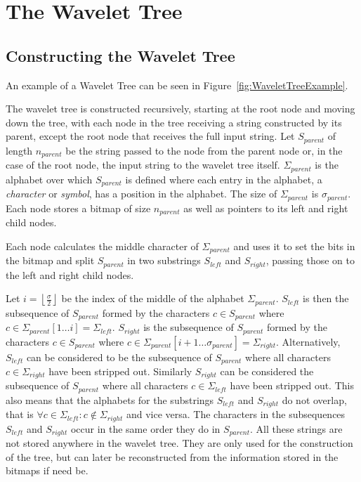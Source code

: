 \section{The Wavelet Tree}


\subsection{Constructing the Wavelet Tree}
\label{sec:nodeconstruction}
An example of a Wavelet Tree can be seen in Figure~\ref{fig:WaveletTreeExample}.

The wavelet tree is constructed recursively, starting at the root node and moving down the tree, with each node in the tree receiving a string constructed by its parent, except the root node that receives the full input string.
Let $S_{\mathit{parent}}$ of length $n_{\mathit{parent}}$ be the string passed to the node from the parent node or, in the case of the root node, the input string to the wavelet tree itself.
$\Sigma_{\mathit{parent}}$ is the alphabet over which $S_{\mathit{parent}}$ is defined where each entry in the alphabet, a \textit{character} or \textit{symbol}, has a position in the alphabet.
The size of $\Sigma_{\mathit{parent}}$ is $\sigma_{\mathit{parent}}$.
Each node stores a bitmap of size $n_{\mathit{parent}}$ as well as pointers to its left and right child nodes.

Each node calculates the middle character of $\Sigma_{\mathit{parent}}$ and uses it to set the bits in the bitmap and split $S_{\mathit{parent}}$ in two substrings $S_{\mathit{left}}$ and $S_{\mathit{right}}$, passing those on to the left and right child nodes.

Let $i = \left\lfloor\frac{\sigma}{2}\right\rfloor$ be the index of the middle of the alphabet $\Sigma_{\mathit{parent}}$.
$S_{\mathit{left}}$ is then the subsequence of $S_{\mathit{parent}}$ formed by the characters $c \in S_{\mathit{parent}}$ where $c \in \Sigma_{\mathit{parent}}[1 \ldots i] = \Sigma_{\mathit{left}}$.
$S_{\mathit{right}}$ is the subsequence of $S_{\mathit{parent}}$ formed by the characters $c \in S_{\mathit{parent}}$ where $c \in \Sigma_{\mathit{parent}}[i+1 \ldots \sigma_{\mathit{parent}}] = \Sigma_{\mathit{right}}$.
Alternatively, $S_{\mathit{left}}$ can be considered to be the subsequence of $S_{\mathit{parent}}$ where all characters $c \in \Sigma_{\mathit{right}}$ have been stripped out. Similarly $S_{\mathit{right}}$ can be considered the subsequence of $S_{\mathit{parent}}$ where all characters $c \in \Sigma_{\mathit{left}}$ have been stripped out.
This also means that the alphabets for the substrings $S_{\mathit{left}}$ and $S_{\mathit{right}}$ do not overlap, that is $\forall c \in \Sigma_{\mathit{left}}: c \notin \Sigma_{\mathit{right}}$ and vice versa.
The characters in the subsequences $S_{\mathit{left}}$ and $S_{\mathit{right}}$ occur in the same order they do in $S_{\mathit{parent}}$.
All these strings are not stored anywhere in the wavelet tree.
They are only used for the construction of the tree, but can later be reconstructed from the information stored in the bitmaps if need be.

